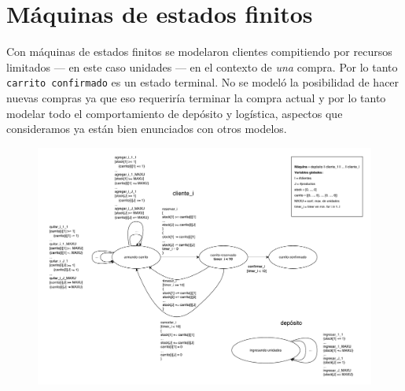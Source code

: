 \section{Máquinas de estados finitos}

Con máquinas de estados finitos se modelaron clientes compitiendo por recursos
limitados --- en este caso unidades --- en el contexto de \textit{una} compra.
Por lo tanto \texttt{carrito confirmado} es un estado terminal.
No se modeló la posibilidad de hacer nuevas compras ya que eso requeriría
terminar la compra actual y por lo tanto modelar todo el comportamiento de
depósito y logística, aspectos que consideramos ya están bien enunciados con
otros modelos.

\begin{figure}[H]
  \begin{center}
  \includegraphics[angle=90,height=\textheight]{tp2/images/fsm.pdf}
  \end{center}
\end{figure}
